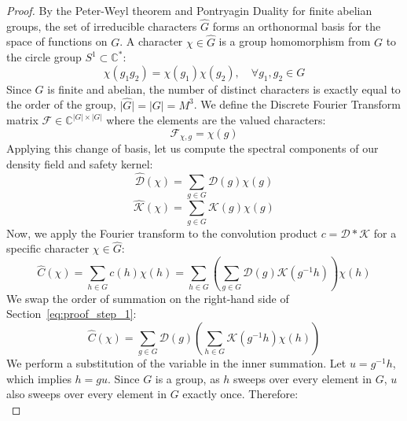 \documentclass[11pt,a4paper]{book}
\begin{document}
\begin{proof}
By the Peter-Weyl theorem and Pontryagin Duality for finite abelian groups, the set of irreducible characters $\widehat{G}$ forms an orthonormal basis for the space of functions on $G$. A character $\chi \in \widehat{G}$ is a group homomorphism from $G$ to the circle group $S^1 \subset \mathbb{C}^*$:
\begin{equation}
\label{eq:homomorphism}
\chi(g_1 g_2) = \chi(g_1)\chi(g_2), \quad \forall g_1, g_2 \in G
\end{equation}
Since $G$ is finite and abelian, the number of distinct characters is exactly equal to the order of the group, $\lvert \widehat{G} \rvert = \lvert G \rvert = M^3$. We define the Discrete Fourier Transform matrix $\mathcal{F} \in \mathbb{C}^{\lvert G \rvert \times \lvert G \rvert}$ where the elements are the valued characters:
\begin{equation}
\label{eq:fourier_matrix}
\mathcal{F}_{\chi, g} = \chi(g)
\end{equation}
Applying this change of basis, let us compute the spectral components of our density field and safety kernel:
\begin{equation}
\label{eq:spectral_density}
\widehat{\mathcal{D}}(\chi) = \sum_{g \in G} \mathcal{D}(g) \chi(g)
\end{equation}
\begin{equation}
\label{eq:spectral_kernel}
\widehat{\mathcal{K}}(\chi) = \sum_{g \in G} \mathcal{K}(g) \chi(g)
\end{equation}
Now, we apply the Fourier transform to the convolution product $c = \mathcal{D} * \mathcal{K}$ for a specific character $\chi \in \widehat{G}$:
\begin{equation}
\label{eq:proof_step_1}
\widehat{C}(\chi) = \sum_{h \in G} c(h) \chi(h) = \sum_{h \in G} \left( \sum_{g \in G} \mathcal{D}(g) \mathcal{K}(g^{-1} h) \right) \chi(h)
\end{equation}
We swap the order of summation on the right-hand side of Section~\ref{eq:proof_step_1}:
\begin{equation}
\label{eq:proof_step_2}
\widehat{C}(\chi) = \sum_{g \in G} \mathcal{D}(g) \left( \sum_{h \in G} \mathcal{K}(g^{-1} h) \chi(h) \right)
\end{equation}
We perform a substitution of the variable in the inner summation. Let $u = g^{-1} h$, which implies $h = g u$. Since $G$ is a group, as $h$ sweeps over every element in $G$, $u$ also sweeps over every element in $G$ exactly once. Therefore:
\begin{equation}
\label{eq:proof_step_3}

\end{equation}
\end{proof}
\end{document}
